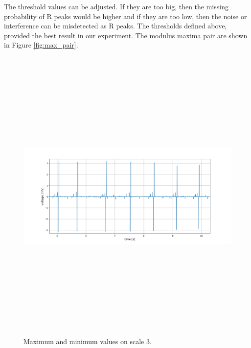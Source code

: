 The threshold values can be adjusted. If they are too big, then the missing probability of R peaks would be higher and if they are too low, then the noise or interference can be misdetected as R peaks. The thresholds defined above, provided the best result in our experiment. The modulus maxima pair are shown in Figure \ref{fig:max_pair}.

\begin{figure}[]
	\centering
	\includegraphics[width=15cm,height=15cm,keepaspectratio=true]{images/maximas_on_level_3}
	\caption{
		Maximum and minimum values on scale 3.
	}
	\label{fig:maximas_on_level_3}
\end{figure}

